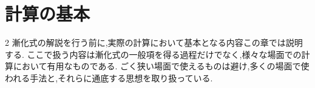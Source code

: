 
\chapter{計算の基本}
\begin{multicols*}{2}
  漸化式の解説を行う前に,実際の計算において基本となる内容この章では説明する.
  ここで扱う内容は漸化式の一般項を得る過程だけでなく,様々な場面での計算において有用なものである.
  ごく狭い場面で使えるものは避け,多くの場面で使われる手法と,それらに通底する思想を取り扱っている.




\end{multicols*}
